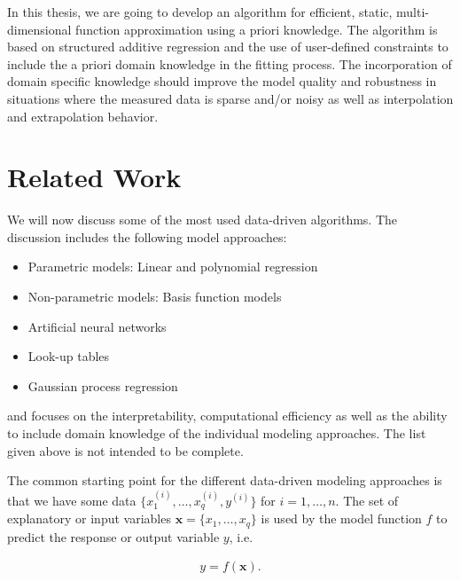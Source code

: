 \documentclass[10pt,a4paper]{article}
\begin{document}
In this thesis, we are going to develop an algorithm for efficient, static, multi-dimensional function approximation using a priori knowledge. The algorithm is based on structured additive regression \cite{fahrmeir2013regression} and the use of user-defined constraints to include the a priori domain knowledge in the fitting process. \cite{hofner2011monotonicity} The incorporation of domain specific knowledge should improve the model quality and robustness in situations where the measured data is sparse and/or noisy as well as interpolation and extrapolation behavior. 

\section{Related Work}

We will now discuss some of the most used data-driven algorithms. The discussion includes the following model approaches:

\begin{itemize}
	\item Parametric models: Linear and polynomial regression
	\item Non-parametric models: Basis function models
	\item Artificial neural networks
	\item Look-up tables
	\item Gaussian process regression
\end{itemize}

and focuses on the interpretability, computational efficiency as well as the ability to include domain knowledge of the individual modeling approaches. The list given above is not intended to be complete. 

The common starting point for the different data-driven modeling approaches is that we have some data $\{x_1^{(i)}, \dots, x_q^{(i)}, y^{(i)} \}$ for $i = 1, \dots, n$. The set of explanatory or input variables $\boldsymbol{x} = \{x_1, \dots, x_q\}$ is used by the model function $f$ to predict the response or output variable $y$, i.e.

\begin{align} \label{eq:basic-model-structure}
	y = f(\boldsymbol{x}).
\end{align}
\end{document}
